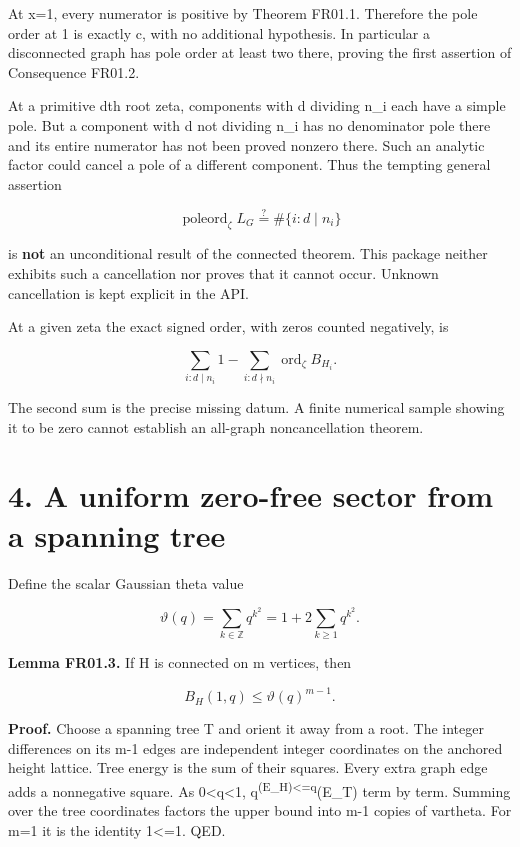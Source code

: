 \documentclass[
  11pt,
  a4paper,
]{report}
\begin{document}
At x=1, every numerator is positive by Theorem FR01.1. Therefore the
pole order at 1 is exactly c, with no additional hypothesis. In
particular a disconnected graph has pole order at least two there,
proving the first assertion of Consequence FR01.2.

At a primitive dth root zeta, components with d dividing n\_i each have
a simple pole. But a component with d not dividing n\_i has no
denominator pole there and its entire numerator has not been proved
nonzero there. Such an analytic factor could cancel a pole of a
different component. Thus the tempting general assertion

\[
 \operatorname{poleord}_{\zeta}L_G
 \stackrel{?}{=}\#\{i:d\mid n_i\}
\]

is \textbf{not} an unconditional result of the connected theorem. This
package neither exhibits such a cancellation nor proves that it cannot
occur. Unknown cancellation is kept explicit in the API.

At a given zeta the exact signed order, with zeros counted negatively,
is

\[
 \sum_{i:d\mid n_i}1
  -\sum_{i:d\nmid n_i}\operatorname{ord}_{\zeta} B_{H_i}.
\]

The second sum is the precise missing datum. A finite numerical sample
showing it to be zero cannot establish an all-graph noncancellation
theorem.

\hypertarget{a-uniform-zero-free-sector-from-a-spanning-tree}{%
\section{4. A uniform zero-free sector from a spanning
tree}\label{a-uniform-zero-free-sector-from-a-spanning-tree}}

Define the scalar Gaussian theta value

\[
 \vartheta(q)=\sum_{k\in\mathbb Z}q^{k^2}
            =1+2\sum_{k\ge1}q^{k^2}.
\]

\textbf{Lemma FR01.3.} If H is connected on m vertices, then

\[
 B_H(1,q)\le\vartheta(q)^{m-1}.
\]

\textbf{Proof.} Choose a spanning tree T and orient it away from a root.
The integer differences on its m-1 edges are independent integer
coordinates on the anchored height lattice. Tree energy is the sum of
their squares. Every extra graph edge adds a nonnegative square. As
0\textless q\textless1, q\textsuperscript{(E\_H)\textless=q}(E\_T) term
by term. Summing over the tree coordinates factors the upper bound into
m-1 copies of vartheta. For m=1 it is the identity 1\textless=1. QED.
\end{document}
